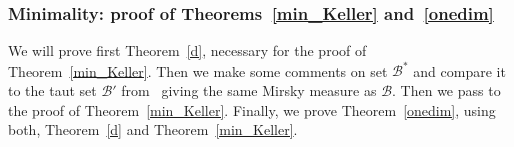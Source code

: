 \documentclass[leqno,a4paper,12pt]{article}
\newtheorem{Th}{Theorem}[section]
\theoremstyle{definition}
\newcommand{\N}{{\mathbb{N}}}
\newcommand{\cC}{\mathcal{C}}
\newcommand{\sB}{\mathscr{B}}
\begin{document}
\subsubsection{Minimality: proof of Theorems~\ref{min_Keller} and~\ref{onedim}}
We will prove first Theorem~\ref{d}, necessary for the proof of Theorem~\ref{min_Keller}. Then we make some comments on set $\mathscr{B}^*$ and compare it to the taut set $\mathscr{B}'$ from~\cite{MR3803141} giving the same Mirsky measure as $\mathscr{B}$. Then we pass to the proof of Theorem~\ref{min_Keller}. Finally, we prove Theorem~\ref{onedim}, using both, Theorem~\ref{d} and Theorem~\ref{min_Keller}.
\end{document}
